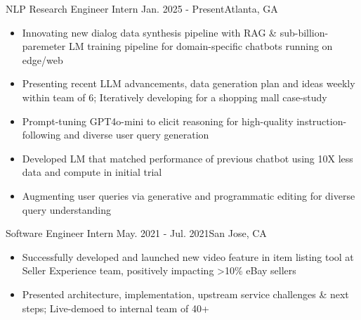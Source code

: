     {NLP Research Engineer Intern}
    {Jan. 2025 - Present}{Atlanta, GA}
\begin{itemize}
    \item Innovating new dialog data synthesis pipeline with RAG \& sub-billion-paremeter LM training pipeline for domain-specific chatbots running on edge/web

    \item Presenting recent LLM advancements, data generation plan and ideas weekly within team of 6; Iteratively developing for a shopping mall case-study

    \item Prompt-tuning GPT4o-mini to elicit reasoning for high-quality instruction-following and diverse user query generation


    \item Developed LM that matched performance of previous chatbot using 10X less data and compute in initial trial 

    \item Augmenting user queries via generative and programmatic editing for diverse query understanding
\end{itemize}
\dividerSmall


    {Software Engineer Intern}
    {May. 2021 - Jul. 2021}{San Jose, CA}
\begin{itemize}

    \item Successfully developed and launched new video feature in item listing tool at Seller Experience team, positively impacting >10\% eBay sellers

    \item Presented architecture, implementation, upstream service challenges \& next steps; Live-demoed to internal team of 40+
\end{itemize}
\dividerSmall


